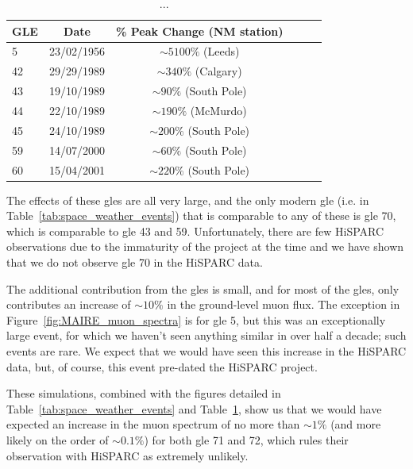 \begin{table}
	\begin{center}
		\caption{...}
		\label{tab:MAIRE_GLEs}
		\begin{tabular}{l c c c c c}
			\hline
			GLE & Date & \% Peak Change (NM station) \\
			\hline
			5 & 23/02/1956 & $\sim 5100\%$ (Leeds) \\
			42 & 29/29/1989 & $\sim 340\%$ (Calgary) \\
			43 & 19/10/1989 & $\sim 90\%$ (South Pole) \\
			44  & 22/10/1989 & $\sim 190\%$ (McMurdo) \\
			45  & 24/10/1989 & $\sim 200\%$ (South Pole) \\
			59 & 14/07/2000 & $\sim 60\%$ (South Pole) \\
			60 & 15/04/2001 & $\sim 220\%$ (South Pole) \\
			\hline
		\end{tabular}
	\end{center}
\end{table}

The effects of these \glspl{gle} are all very large, and the only modern \gls{gle} (i.e. in Table~\ref{tab:space_weather_events}) that is comparable to any of these is \gls{gle} 70, which is comparable to \gls{gle} 43 and 59. Unfortunately, there are few HiSPARC observations due to the immaturity of the project at the time and we have shown that we do not observe \gls{gle} 70 in the HiSPARC data.

The additional contribution from the \glspl{gle} is small, and for most of the \glspl{gle}, only contributes an increase of $\sim 10 \%$ in the ground-level muon flux. The exception in Figure~\ref{fig:MAIRE_muon_spectra} is for \gls{gle} 5, but this was an exceptionally large event, for which we haven't seen anything similar in over half a decade; such events are rare. We expect that we would have seen this increase in the HiSPARC data, but, of course, this event pre-dated the HiSPARC project.

These simulations, combined with the figures detailed in Table~\ref{tab:space_weather_events} and Table~\ref{tab:MAIRE_GLEs}, show us that we would have expected an increase in the muon spectrum of no more than $\sim 1\%$ (and more likely on the order of $\sim 0.1\%$) for both \gls{gle} 71 and 72, which rules their observation with HiSPARC as extremely unlikely.




